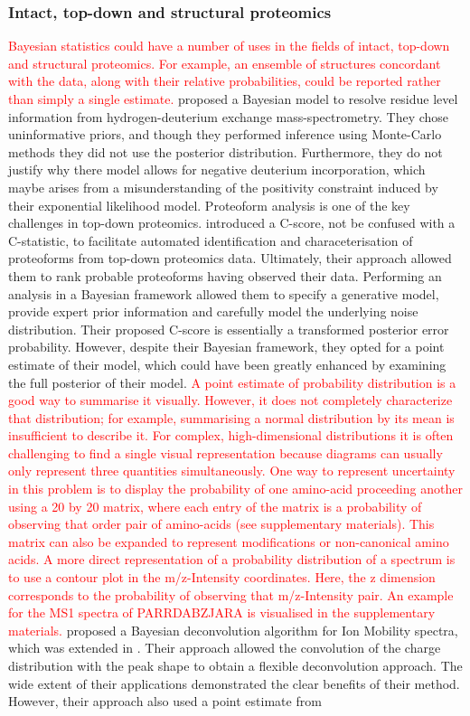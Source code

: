 \documentclass[12pt,english, journal=jpr, layout=twocolumn]{article}
\begin{document}
\subsubsection{Intact, top-down and structural proteomics}
 \textcolor{red}{Bayesian statistics could have a number of uses in the fields of intact, top-down and structural proteomics. For example, an ensemble of structures concordant with the data, along with their relative probabilities, could be reported rather than simply a single estimate.} \citet{Saltzberg::2017} proposed a Bayesian model to resolve residue level information from hydrogen-deuterium exchange mass-spectrometry. They chose uninformative priors, and though they performed inference using Monte-Carlo methods they did not use the posterior distribution. Furthermore, they do not justify why there model allows for negative deuterium incorporation, which maybe arises from a misunderstanding of the positivity constraint induced by their exponential likelihood model. Proteoform analysis is one of the key challenges in top-down proteomics. \citet{Leduc::2014} introduced a C-score, not be confused with a C-statistic, to facilitate automated identification and characeterisation of proteoforms from top-down proteomics data. Ultimately, their approach allowed them to rank probable proteoforms having observed their data. Performing an analysis in a Bayesian framework allowed them to specify a generative model, provide expert prior information and carefully model the underlying noise distribution. Their proposed C-score is essentially a transformed posterior error probability. However, despite their Bayesian framework, they opted for a point estimate of their model, which could have been greatly enhanced by examining the full posterior of their model. \textcolor{red}{A point estimate of probability distribution is a good way to summarise it visually. However, it does not completely characterize that distribution; for example, summarising a normal distribution by its mean is insufficient to describe it. For complex, high-dimensional distributions it is often challenging to find a single visual representation because diagrams can usually only represent three quantities simultaneously. One way to represent uncertainty in this problem is to display the probability of one amino-acid proceeding another using a 20 by 20 matrix, where each entry of the matrix is a probability of observing that order pair of amino-acids (see supplementary materials). This matrix can also be expanded to represent modifications or non-canonical amino acids. A more direct representation of a probability distribution of a spectrum is to use a contour plot in the m/z-Intensity coordinates. Here, the z dimension corresponds to the probability of observing that m/z-Intensity pair. An example for the MS1 spectra of PARRDABZJARA is visualised in the supplementary materials. } \citet{Marty::2015} proposed a Bayesian deconvolution algorithm for Ion Mobility spectra, which was extended in \citet{Kostelic::2021}. Their approach allowed the convolution of the charge distribution with the peak shape to obtain a flexible deconvolution approach. The wide extent of their applications demonstrated the clear benefits of their method. However, their approach also used a point estimate from 
\end{document}
